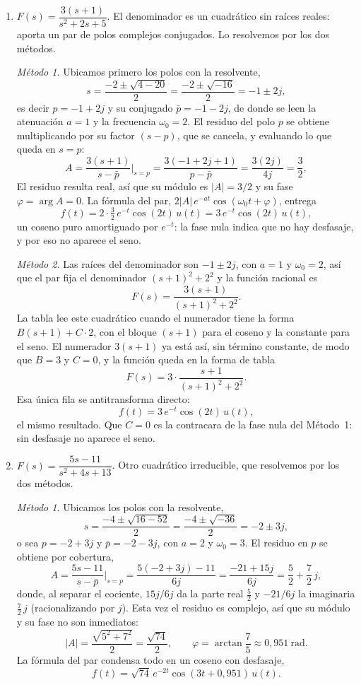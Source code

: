 \documentclass[10pt,a4paper]{article}
\begin{document}
\begin{enumerate}
	\item $F(s)=\dfrac{3(s+1)}{s^2+2s+5}$. El denominador es un cuadrático
	sin raíces reales: aporta un par de polos complejos conjugados. Lo
	resolvemos por los dos métodos.

	\emph{Método 1.} Ubicamos primero los polos con la resolvente,
	\[
		s=\frac{-2\pm\sqrt{4-20}}{2}=\frac{-2\pm\sqrt{-16}}{2}=-1\pm 2j,
	\]
	es decir $p=-1+2j$ y su conjugado $\bar p=-1-2j$, de donde se leen la
	atenuación $a=1$ y la frecuencia $\omega_0=2$. El residuo del polo $p$
	se obtiene multiplicando por su factor $(s-p)$, que se cancela, y
	evaluando lo que queda en $s=p$:
	\[
		A=\frac{3(s+1)}{s-\bar p}\bigg|_{s=p}
	 =\frac{3(-1+2j+1)}{p-\bar p}
	 =\frac{3(2j)}{4j}=\frac32,
	\]
	El residuo resulta real,
	así que su módulo es $|A|=3/2$ y su fase $\varphi=\arg A=0$. La fórmula del par,
	$2|A|\,e^{-at}\cos(\omega_0 t+\varphi)$, entrega
	\[
		f(t)=2\cdot\tfrac32\,e^{-t}\cos(2t)\,u(t)=3\,e^{-t}\cos(2t)\,u(t),
	\]
	un coseno puro amortiguado por $e^{-t}$: la fase nula indica que no hay
	desfasaje, y por eso no aparece el seno.

	\emph{Método 2.} Las raíces del denominador son $-1\pm2j$, con $a=1$ y
	$\omega_0=2$, así que el par fija el denominador $(s+1)^2+2^2$ y la función
	racional es
	\[
		F(s)=\frac{3(s+1)}{(s+1)^2+2^2}.
	\]
	La tabla lee este cuadrático cuando el numerador tiene la forma
	$B(s+1)+C\cdot2$, con el bloque $(s+1)$ para el coseno y la constante para
	el seno. El numerador $3(s+1)$ ya está así, sin término constante, de modo
	que $B=3$ y $C=0$, y la función queda en la forma de tabla
	\[
		F(s)=3\cdot\frac{s+1}{(s+1)^2+2^2}.
	\]
	Esa única fila se antitransforma directo:
	\[
		f(t)=3\,e^{-t}\cos(2t)\,u(t),
	\]
	el mismo resultado. Que $C=0$ es la contracara de la fase nula del
	Método~1: sin desfasaje no aparece el seno.

	\item $F(s)=\dfrac{5s-11}{s^2+4s+13}$. Otro cuadrático irreducible, que
	resolvemos por los dos métodos.

	\emph{Método 1.} Ubicamos los polos con la resolvente,
	\[
		s=\frac{-4\pm\sqrt{16-52}}{2}=\frac{-4\pm\sqrt{-36}}{2}=-2\pm 3j,
	\]
	o sea $p=-2+3j$ y $\bar p=-2-3j$, con $a=2$ y $\omega_0=3$. El residuo en
	$p$ se obtiene por cobertura,
	\[
		A=\frac{5s-11}{s-\bar p}\bigg|_{s=p}
		 =\frac{5(-2+3j)-11}{6j}
		 =\frac{-21+15j}{6j}
		 =\frac52+\frac72\,j,
	\]
	donde, al separar el cociente, $15j/6j$ da la parte real $\tfrac52$ y
	$-21/6j$ la imaginaria $\tfrac72\,j$ (racionalizando por $j$). Esta vez
	el residuo es complejo, así que su módulo y su fase no son inmediatos:
	\[
		|A|=\frac{\sqrt{5^2+7^2}}{2}=\frac{\sqrt{74}}{2},
		\qquad
		\varphi=\arctan\frac{7}{5}\approx 0{,}951\ \text{rad}.
	\]
	La fórmula del par condensa todo en un coseno con desfasaje,
	\[
		f(t)=\sqrt{74}\,e^{-2t}\cos(3t+0{,}951)\,u(t).
	\]


\end{enumerate}
\end{document}
